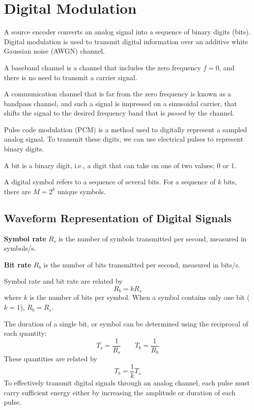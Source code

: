 \documentclass{article}
\begin{document}
\section{Digital Modulation}
A source encoder converts an analog signal into a sequence of binary
digits (bits). Digital modulation is used to transmit digital
information over an additive white Gaussian noise (AWGN) channel.
\begin{definition}
    A baseband channel is a channel that includes the zero frequency
    \(f = 0\), and there is no need to transmit a carrier signal.
\end{definition}
\begin{definition}
    A communication channel that is far from the zero frequency is
    known as a bandpass channel, and such a signal is impressed on a
    sinusoidal carrier, that shifts the signal to the desired frequency
    band that is \textit{passed} by the channel.
\end{definition}
Pulse code modulation (PCM) is a method used to digitally represent a
sampled analog signal. To transmit these digits, we can use electrical
pulses to represent binary digits.
\begin{definition}[Bit]
    A bit is a binary digit, i.e., a digit that can take on one of two
    values; 0 or 1.
\end{definition}
\begin{definition}
    A digital symbol refers to a sequence of several bits.
    For a sequence of \(k\) bits, there are \(M = 2^k\) unique symbols.
\end{definition}
\subsection{Waveform Representation of Digital Signals}
\textbf{Symbol rate} \(R_s\) is the number of symbols transmitted
per second, measured in \unit{symbols/s}.

\textbf{Bit rate} \(R_b\) is the number of bits transmitted
per second, measured in \unit{bits/s}.

Symbol rate and bit rate are related by
\begin{equation*}
    R_b = k R_s
\end{equation*}
where \(k\) is the number of bits per symbol. When a symbol contains
only one bit (\(k = 1\)), \(R_b = R_s\).

The duration of a single bit, or symbol can be determined using the
reciprocal of each quantity:
\begin{equation*}
    T_s = \frac{1}{R_s} \qquad T_b = \frac{1}{R_b}
\end{equation*}
These quantities are related by
\begin{equation*}
    T_b = \frac{1}{k} T_s
\end{equation*}
To effectively transmit digital signals through an analog channel, each
pulse must carry sufficient energy either by increasing the amplitude
or duration of each pulse.
\end{document}
